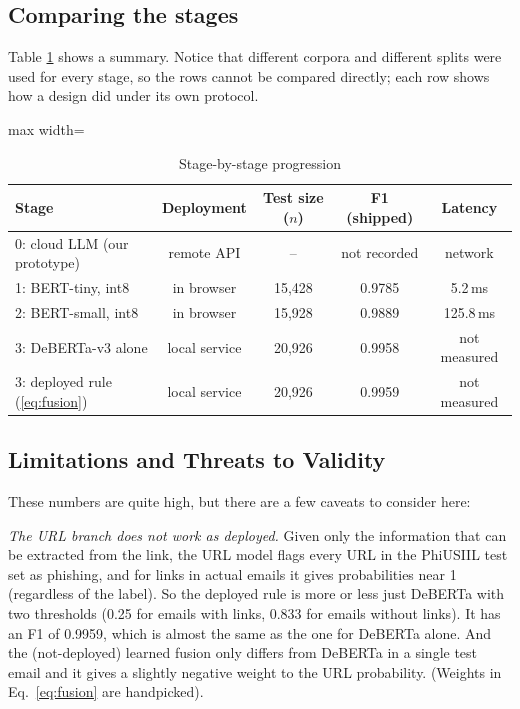 \documentclass[conference]{IEEEtran}
\begin{document}
\subsection{Comparing the stages}
Table \ref{tab:stages} shows a summary. Notice that different corpora and different splits were used for every stage, so the rows cannot be compared directly; each row shows how a design did under its own protocol.

\begin{table}[t]
\centering
\caption{Stage-by-stage progression}
\label{tab:stages}
\begin{adjustbox}{max width=\columnwidth}
\begin{tabular}{lcccc}
\toprule
Stage & Deployment & Test size ($n$) & F1 (shipped) & Latency \\
\midrule
0: cloud LLM (our prototype) & remote API & -- & not recorded & network \\
1: BERT-tiny, int8 & in browser & 15,428 & 0.9785 & 5.2\,ms \\
2: BERT-small, int8 & in browser & 15,928 & 0.9889 & 125.8\,ms \\
3: DeBERTa-v3 alone & local service & 20,926 & 0.9958 & not measured \\
3: deployed rule (\ref{eq:fusion}) & local service & 20,926 & 0.9959 & not measured \\
\bottomrule
\end{tabular}
\end{adjustbox}
\end{table}

\subsection{Limitations and Threats to Validity}
These numbers are quite high, but there are a few caveats to consider here:

\emph{The URL branch does not work as deployed.} Given only the information that can be extracted from the link, the URL model flags every URL in the PhiUSIIL test set as phishing, and for links in actual emails it gives probabilities near 1 (regardless of the label). So the deployed rule is more or less just DeBERTa with two thresholds (0.25 for emails with links, 0.833 for emails without links). It has an F1 of 0.9959, which is almost the same as the one for DeBERTa alone. And the (not-deployed) learned fusion only differs from DeBERTa in a single test email and it gives a slightly negative weight to the URL probability. (Weights in Eq.~\ref{eq:fusion} are handpicked).
\end{document}
